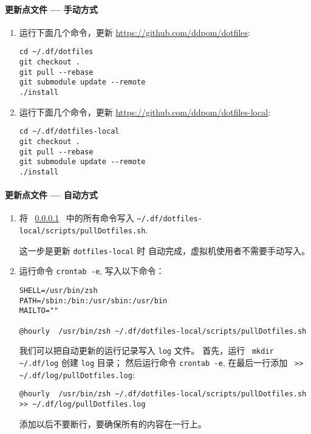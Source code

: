 \documentclass[cn,11pt, simple]{elegantbook}
\begin{document}
\paragraph{更新点文件 --- 手动方式}%
\label{sssub:update-dotfiles-manual}

\begin{enumerate}
    \item 运行下面几个命令，更新 \href{https://github.com/ddpom/dotfiles}
        {https://github.com/ddpom/dotfiles}:
\begin{lstlisting}[escapeinside=``]
cd ~/.df/dotfiles
git checkout .
git pull --rebase
git submodule update --remote
./install
\end{lstlisting}
    \item 运行下面几个命令，更新
        \href{https://github.com/ddpom/dotfiles-local}
        {https://github.com/ddpom/dotfiles-local}:
\begin{lstlisting}[escapeinside=``]
cd ~/.df/dotfiles-local
git checkout .
git pull --rebase
git submodule update --remote
./install
\end{lstlisting}
\end{enumerate}

\paragraph{更新点文件 --- 自动方式}%
\label{sssub:update-dotfiles-crontab}

\begin{enumerate}
    \item 将 ~\ref{sssub:update-dotfiles-manual}~ 中的所有命令写入
        \lstinline{~/.df/dotfiles-local/scripts/pullDotfiles.sh}.
        \begin{note}\label{note:update-dotfiles-crontab}
            这一步是更新 \lstinline{dotfiles-local} 时
            自动完成，虚拟机使用者不需要手动写入。
        \end{note}
    \item 运行命令 \lstinline{crontab -e}, 写入以下命令：
\begin{lstlisting}[escapeinside=``]
SHELL=/usr/bin/zsh
PATH=/sbin:/bin:/usr/sbin:/usr/bin
MAILTO=""

@hourly  /usr/bin/zsh ~/.df/dotfiles-local/scripts/pullDotfiles.sh
\end{lstlisting}
\begin{note}\label{note:crontab}
    我们可以把自动更新的运行记录写入 \lstinline{log} 文件。
    首先，运行~ \lstinline{mkdir ~/.df/log} 创建 \lstinline{log} 目录；
    然后运行命令 \lstinline{crontab -e}, 在最后一行添加
    \lstinline{ >> ~/.df/log/pullDotfiles.log}:
\begin{lstlisting}[escapeinside=``]
@hourly  /usr/bin/zsh ~/.df/dotfiles-local/scripts/pullDotfiles.sh >> ~/.df/log/pullDotfiles.log
\end{lstlisting}
添加以后不要断行，要确保所有的内容在一行上。
\end{note}
\end{enumerate}
\end{document}
